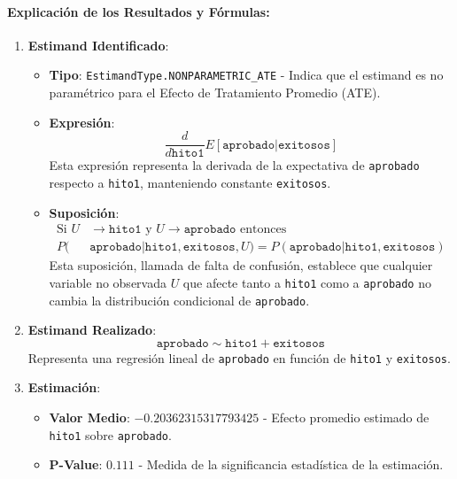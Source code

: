 \paragraph{Explicación de los Resultados y Fórmulas:}

\begin{enumerate}
    \item \textbf{Estimand Identificado}:
    \begin{itemize}
        \item \textbf{Tipo}: \texttt{EstimandType.NONPARAMETRIC\_ATE} - Indica que el estimand es no paramétrico para el Efecto de Tratamiento Promedio (ATE).
        \item \textbf{Expresión}:
        \[
        \frac{d}{d\texttt{hito1}}E[\texttt{aprobado}|\texttt{exitosos}]
        \]
        Esta expresión representa la derivada de la expectativa de \texttt{aprobado} respecto a \texttt{hito1}, manteniendo constante \texttt{exitosos}.
        
        \item \textbf{Suposición}:
        \begin{align}
            \text{Si } U &\rightarrow \texttt{hito1} \text{ y } U \rightarrow \texttt{aprobado} \text{ entonces } \nonumber \\
            P(&\texttt{aprobado}|\texttt{hito1},\texttt{exitosos},U) = P(\texttt{aprobado}|\texttt{hito1},\texttt{exitosos})
        \end{align}
        Esta suposición, llamada de falta de confusión, establece que cualquier variable no observada \( U \) que afecte tanto a \texttt{hito1} como a \texttt{aprobado} no cambia la distribución condicional de \texttt{aprobado}.
    \end{itemize}
    
    \item \textbf{Estimand Realizado}:
    \[ 
    \texttt{aprobado} \sim \texttt{hito1} + \texttt{exitosos}
    \]
    Representa una regresión lineal de \texttt{aprobado} en función de \texttt{hito1} y \texttt{exitosos}.
    
    \item \textbf{Estimación}:
    \begin{itemize}
        \item \textbf{Valor Medio}: \( -0.20362315317793425 \) - Efecto promedio estimado de \texttt{hito1} sobre \texttt{aprobado}.
        \item \textbf{P-Value}: \( 0.111 \) - Medida de la significancia estadística de la estimación.
    \end{itemize}
\end{enumerate}

